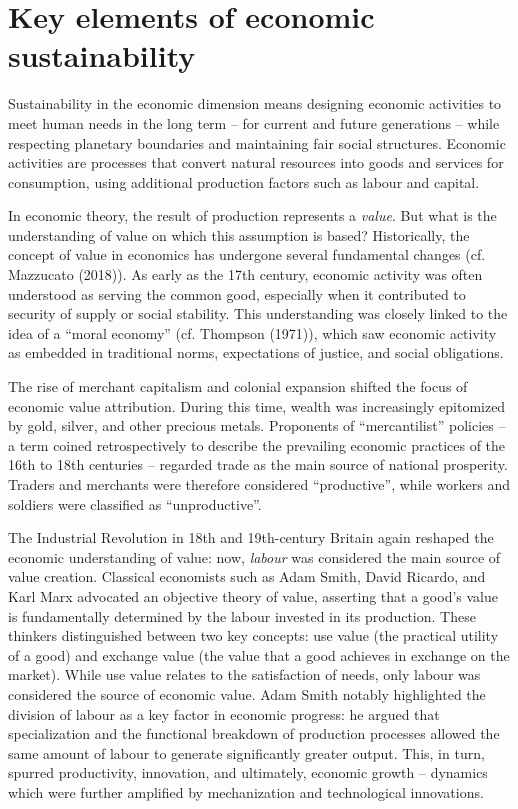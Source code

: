 \documentclass[
  a4paper,
  openany]{book}
\begin{document}
\section{Key elements of economic
sustainability}\label{key-elements-of-economic-sustainability}

Sustainability in the economic dimension means designing economic
activities to meet human needs in the long term -- for current and
future generations -- while respecting planetary boundaries and
maintaining fair social structures. Economic activities are processes
that convert natural resources into goods and services for consumption,
using additional production factors such as labour and capital.

In economic theory, the result of production represents a \emph{value}.
But what is the understanding of value on which this assumption is
based? Historically, the concept of value in economics has undergone
several fundamental changes (cf. Mazzucato (2018)). As early as the 17th
century, economic activity was often understood as serving the common
good, especially when it contributed to security of supply or social
stability. This understanding was closely linked to the idea of a
``moral economy'' (cf. Thompson (1971)), which saw economic activity as
embedded in traditional norms, expectations of justice, and social
obligations.

The rise of merchant capitalism and colonial expansion shifted the focus
of economic value attribution. During this time, wealth was increasingly
epitomized by gold, silver, and other precious metals. Proponents of
``mercantilist'' policies -- a term coined retrospectively to describe
the prevailing economic practices of the 16th to 18th centuries --
regarded trade as the main source of national prosperity. Traders and
merchants were therefore considered ``productive'', while workers and
soldiers were classified as ``unproductive''.

The Industrial Revolution in 18th and 19th-century Britain again
reshaped the economic understanding of value: now, \emph{labour} was
considered the main source of value creation. Classical economists such
as Adam Smith, David Ricardo, and Karl Marx advocated an objective
theory of value, asserting that a good's value is fundamentally
determined by the labour invested in its production. These thinkers
distinguished between two key concepts: use value (the practical utility
of a good) and exchange value (the value that a good achieves in
exchange on the market). While use value relates to the satisfaction of
needs, only labour was considered the source of economic value. Adam
Smith notably highlighted the division of labour as a key factor in
economic progress: he argued that specialization and the functional
breakdown of production processes allowed the same amount of labour to
generate significantly greater output. This, in turn, spurred
productivity, innovation, and ultimately, economic growth -- dynamics
which were further amplified by mechanization and technological
innovations.
\end{document}
